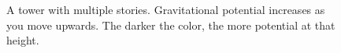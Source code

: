 \begin{figure}
    \centering

    

    \caption{A tower with multiple stories.
    Gravitational potential increases as you move upwards.
    The darker the color, the more potential at that height.}
    \label{fig:tower}
\end{figure}